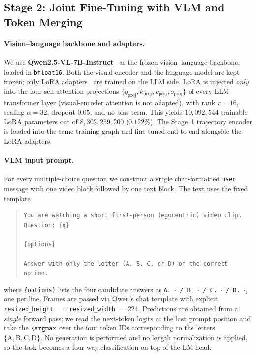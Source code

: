 \subsection{Stage 2: Joint Fine-Tuning with VLM and Token Merging}
\label{sec:impl-stage2}

\paragraph{Vision--language backbone and adapters.}
We use \textbf{Qwen2.5-VL-7B-Instruct}~\citep{bai2025qwen25vl} as the
frozen vision--language backbone, loaded in \texttt{bfloat16}. Both the
visual encoder and the language model are kept frozen; only LoRA
adapters~\citep{hu2021loralowrankadaptationlarge} are trained on the LLM
side. LoRA is injected \emph{only} into the four self-attention projections
$\{q_\text{proj}, k_\text{proj}, v_\text{proj}, o_\text{proj}\}$ of every
LLM transformer layer (visual-encoder attention is not adapted), with rank
$r{=}16$, scaling $\alpha{=}32$, dropout $0.05$, and no bias term. This
yields $10{,}092{,}544$ trainable LoRA parameters out of
$8{,}302{,}259{,}200$ ($0.122\%$). The Stage~1 trajectory encoder is loaded
into the same training graph and fine-tuned end-to-end alongside the LoRA
adapters.

\paragraph{VLM input prompt.}
For every multiple-choice question we construct a single chat-formatted
\texttt{user} message with one video block followed by one text block. The
text uses the fixed template
\begin{quote}\small
\texttt{You are watching a short first-person (egocentric) video clip.}\\
\texttt{Question: \{q\}}\\\\
\texttt{\{options\}}\\\\
\texttt{Answer with only the letter (A, B, C, or D) of the correct option.}
\end{quote}
where \texttt{\{options\}} lists the four candidate answers as
\texttt{A.\,$\cdot$\,/\,B.\,$\cdot$\,/\,C.\,$\cdot$\,/\,D.\,$\cdot$}, one
per line. Frames are passed via Qwen's chat template with explicit
\texttt{resized\_height}~$=$~\texttt{resized\_width}~$=224$. Predictions are
obtained from a \emph{single} forward pass: we read the next-token logits at
the last prompt position and take the $\argmax$ over the four token IDs
corresponding to the letters $\{\text{A},\text{B},\text{C},\text{D}\}$. No
generation is performed and no length normalization is applied, so the task
becomes a four-way classification on top of the LM head.

